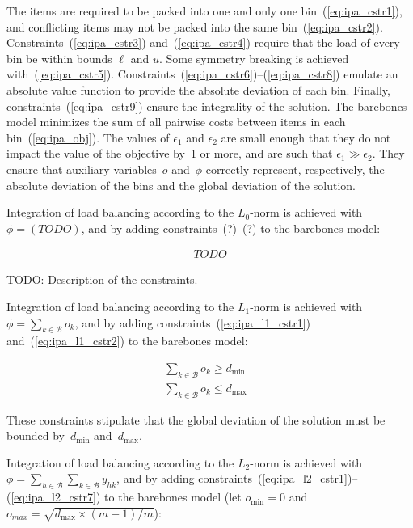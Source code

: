 \documentclass{llncs}
\begin{document}
The items are required to be packed into one and only one bin~(\ref{eq:ipa_cstr1}), and conflicting items may not be packed into the same bin~(\ref{eq:ipa_cstr2}). Constraints~(\ref{eq:ipa_cstr3}) and~(\ref{eq:ipa_cstr4}) require that the load of every bin be within bounds $\ell$ and $u$. Some symmetry breaking is achieved with~(\ref{eq:ipa_cstr5}). Constraints~(\ref{eq:ipa_cstr6})--(\ref{eq:ipa_cstr8}) emulate an absolute value function to provide the absolute deviation of each bin. Finally, constraints~(\ref{eq:ipa_cstr9}) ensure the integrality of the solution. The barebones model minimizes the sum of all pairwise costs between items in each bin~(\ref{eq:ipa_obj}). The values of $\epsilon_{1}$ and $\epsilon_{2}$ are small enough that they do not impact the value of the objective by~1 or more, and are such that $\epsilon_{1} \gg \epsilon_{2}$. They ensure that auxiliary variables~$o$ and~$\phi$ correctly represent, respectively, the absolute deviation of the bins and the global deviation of the solution.

Integration of load balancing according to the $L_{0}$-norm is achieved with $\phi = (TODO)$, and by adding constraints~(?)--(?) to the barebones model:

\begin{align}
  TODO
\end{align}

TODO: Description of the constraints.

Integration of load balancing according to the $L_{1}$-norm is achieved with $\phi = \sum_{k \in \mathcal{B}} o_{k}$, and by adding constraints~(\ref{eq:ipa_l1_cstr1}) and~(\ref{eq:ipa_l1_cstr2}) to the barebones model:

\begin{align}
  & \sum \limits_{k \in \mathcal{B}} o_{k} \geq d_{\min} && \label{eq:ipa_l1_cstr1} \\
  & \sum \limits_{k \in \mathcal{B}} o_{k} \leq d_{\max} && \label{eq:ipa_l1_cstr2}
\end{align}

These constraints stipulate that the global deviation of the solution must be bounded by~$d_{\min}$ and~$d_{\max}$.

Integration of load balancing according to the $L_{2}$-norm is achieved with $\phi = \sum_{h \in \mathcal{B}} \sum_{k \in \mathcal{B}} y_{hk}$, and by adding constraints~(\ref{eq:ipa_l2_cstr1})--(\ref{eq:ipa_l2_cstr7}) to the barebones model (let $o_{\min} = 0$ and $o_{max} = \sqrt{d_{\max} \times (m-1)/m}$):
\end{document}
